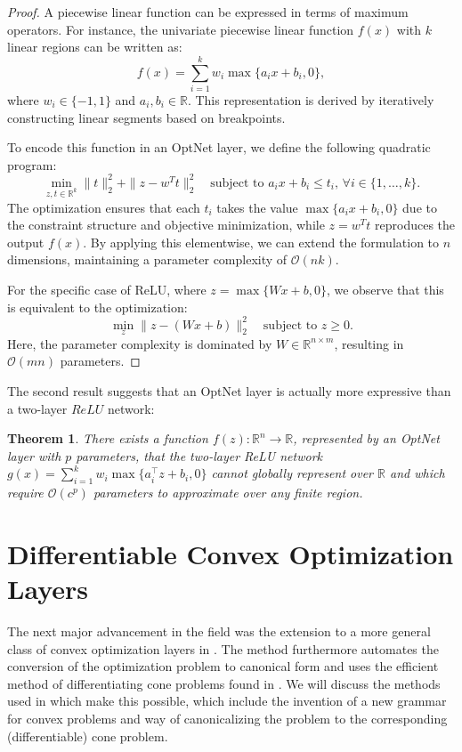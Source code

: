 \documentclass{article}
\newtheorem{theorem}{Theorem}
\begin{document}
\begin{proof}
    A piecewise linear function can be expressed in terms of maximum operators. For instance, the univariate piecewise linear function $f(x)$ with $k$ linear regions can be written as:
    \[
    f(x) = \sum_{i=1}^k w_i \max\{a_i x + b_i, 0\},
    \]
    where $w_i \in \{-1, 1\}$ and $a_i, b_i \in \mathbb{R}$. This representation is derived by iteratively constructing linear segments based on breakpoints.

    To encode this function in an OptNet layer, we define the following quadratic program:
    \[
    \min_{z, t \in \mathbb{R}^k} \|t\|_2^2 + \|z - w^T t\|_2^2 \quad \text{subject to } a_i x + b_i \leq t_i, \, \forall i \in \{1, \ldots, k\}.
    \]
    The optimization ensures that each $t_i$ takes the value $\max\{a_i x + b_i, 0\}$ due to the constraint structure and objective minimization, while $z = w^T t$ reproduces the output $f(x)$. By applying this elementwise, we can extend the formulation to $n$ dimensions, maintaining a parameter complexity of $\mathcal{O}(nk)$.

    For the specific case of ReLU, where $z = \max\{Wx + b, 0\}$, we observe that this is equivalent to the optimization:
    \[
    \min_{z} \|z - (Wx + b)\|_2^2 \quad \text{subject to } z \geq 0.
    \]
    Here, the parameter complexity is dominated by $W \in \mathbb{R}^{n \times m}$, resulting in $\mathcal{O}(mn)$ parameters.
\end{proof}

The second result suggests that an OptNet layer is actually more expressive than a two-layer $ReLU$ network: 

\begin{theorem}
    There exists a function $f(z): \mathbb{R}^n \to \mathbb{R}$, represented by an OptNet layer with $p$ parameters, that the two-layer ReLU network $g(x) = \sum_{i=1}^k w_i \max\{a_i^{\top} z + b_i, 0\}$ cannot globally represent over $\mathbb{R}$ and which require $\mathcal{O}(c^p)$ parameters to approximate over any finite region.
\end{theorem}

\section{Differentiable Convex Optimization Layers}

The next major advancement in the field was the extension to a more general class of convex optimization layers in \citet{differentiableconvexoptimizationlayers}. The method furthermore automates the conversion of the optimization problem to canonical form and uses the efficient method of differentiating cone problems found in \citet{conedifferentiation}. We will discuss the methods used in \citet{differentiableconvexoptimizationlayers} which make this possible, which include the invention of a new grammar for convex problems and way of canonicalizing the problem to the corresponding (differentiable) cone problem. 
\end{document}

